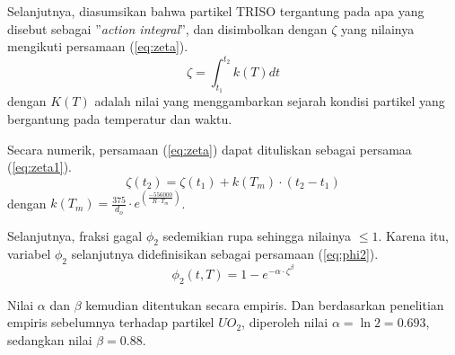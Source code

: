 \documentclass[a4paper,11pt]{report}
\begin{document}
Selanjutnya, diasumsikan bahwa partikel TRISO tergantung pada apa yang disebut sebagai ''\textit{action integral}'', dan disimbolkan dengan $\zeta$ yang nilainya mengikuti persamaan (\ref{eq:zeta}).
\begin{equation}
  \zeta=\int_{t_1}^{t_2} k(T) dt
  \label{eq:zeta}
\end{equation}
dengan $K(T)$ adalah nilai yang menggambarkan sejarah kondisi partikel yang bergantung pada temperatur dan waktu.

Secara numerik, persamaan (\ref{eq:zeta}) dapat dituliskan sebagai persamaa (\ref{eq:zeta1}).
\begin{equation}
  \zeta(t_2)=\zeta(t_1)+k(T_m) \cdot (t_2 - t_1)
  \label{eq:zeta1}
\end{equation}
dengan $k(T_m)=\frac{375}{d_o} \cdot e^{\left(\frac{-556000}{R \cdot T_m}\right)}$.

Selanjutnya, fraksi gagal $\phi_2$ sedemikian rupa sehingga nilainya $\leq 1$. Karena itu, variabel $\phi_2$ selanjutnya didefinisikan sebagai persamaan (\ref{eq:phi2}).
\begin{equation}
\phi_2(t,T)=1-e^{-\alpha \cdot \zeta^{\beta}}
\label{eq:phi2}
\end{equation}

Nilai $\alpha$ dan $\beta$ kemudian ditentukan secara empiris. Dan berdasarkan penelitian empiris sebelumnya terhadap partikel $UO_2$, diperoleh nilai $\alpha=\ln 2=0.693$, sedangkan nilai $\beta=0.88$.




\begin{appendix}
	
	\setcounter{page}{2}
	
\end{appendix}
\end{document}
